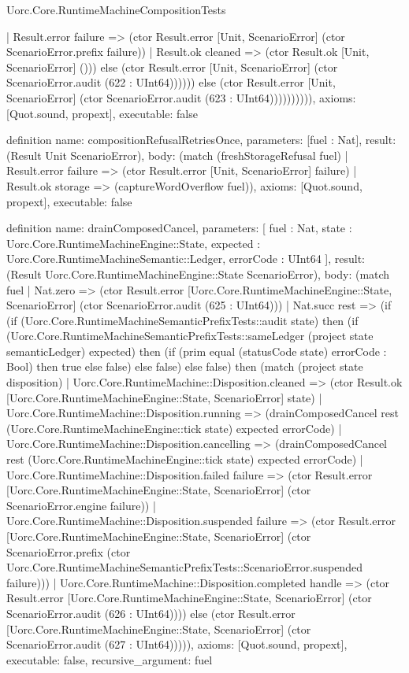 \begin{lexlean}{Uorc.Core.RuntimeMachineCompositionTests}
\begin{semanticmodule}
{            | Result.error failure => (ctor Result.error [Unit, ScenarioError] (ctor ScenarioError.prefix failure))
            | Result.ok cleaned => (ctor Result.ok [Unit, ScenarioError] ())) else (ctor Result.error [Unit, ScenarioError] (ctor ScenarioError.audit (622 : UInt64)))))) else (ctor Result.error [Unit, ScenarioError] (ctor ScenarioError.audit (623 : UInt64)))))))))),
  axioms: [Quot.sound, propext],
  executable: false
}

definition{
  name: compositionRefusalRetriesOnce,
  parameters: [fuel : Nat],
  result: (Result Unit ScenarioError),
  body: (match (freshStorageRefusal fuel)
    | Result.error failure => (ctor Result.error [Unit, ScenarioError] failure)
    | Result.ok storage => (captureWordOverflow fuel)),
  axioms: [Quot.sound, propext],
  executable: false
}

definition{
  name: drainComposedCancel,
  parameters: [
    fuel : Nat,
    state : Uorc.Core.RuntimeMachineEngine::State,
    expected : Uorc.Core.RuntimeMachineSemantic::Ledger,
    errorCode : UInt64
  ],
  result: (Result Uorc.Core.RuntimeMachineEngine::State ScenarioError),
  body: (match fuel
    | Nat.zero => (ctor Result.error [Uorc.Core.RuntimeMachineEngine::State, ScenarioError] (ctor ScenarioError.audit (625 : UInt64)))
    | Nat.succ rest => (if (if (Uorc.Core.RuntimeMachineSemanticPrefixTests::audit state) then (if (Uorc.Core.RuntimeMachineSemanticPrefixTests::sameLedger (project state semanticLedger) expected) then (if (prim equal (statusCode state) errorCode : Bool) then true else false) else false) else false) then (match (project state disposition)
      | Uorc.Core.RuntimeMachine::Disposition.cleaned => (ctor Result.ok [Uorc.Core.RuntimeMachineEngine::State, ScenarioError] state)
      | Uorc.Core.RuntimeMachine::Disposition.running => (drainComposedCancel rest (Uorc.Core.RuntimeMachineEngine::tick state) expected errorCode)
      | Uorc.Core.RuntimeMachine::Disposition.cancelling => (drainComposedCancel rest (Uorc.Core.RuntimeMachineEngine::tick state) expected errorCode)
      | Uorc.Core.RuntimeMachine::Disposition.failed failure => (ctor Result.error [Uorc.Core.RuntimeMachineEngine::State, ScenarioError] (ctor ScenarioError.engine failure))
      | Uorc.Core.RuntimeMachine::Disposition.suspended failure => (ctor Result.error [Uorc.Core.RuntimeMachineEngine::State, ScenarioError] (ctor ScenarioError.prefix (ctor Uorc.Core.RuntimeMachineSemanticPrefixTests::ScenarioError.suspended failure)))
      | Uorc.Core.RuntimeMachine::Disposition.completed handle => (ctor Result.error [Uorc.Core.RuntimeMachineEngine::State, ScenarioError] (ctor ScenarioError.audit (626 : UInt64)))) else (ctor Result.error [Uorc.Core.RuntimeMachineEngine::State, ScenarioError] (ctor ScenarioError.audit (627 : UInt64))))),
  axioms: [Quot.sound, propext],
  executable: false,
  recursive_argument: fuel
}


\end{semanticmodule}
\end{lexlean}
